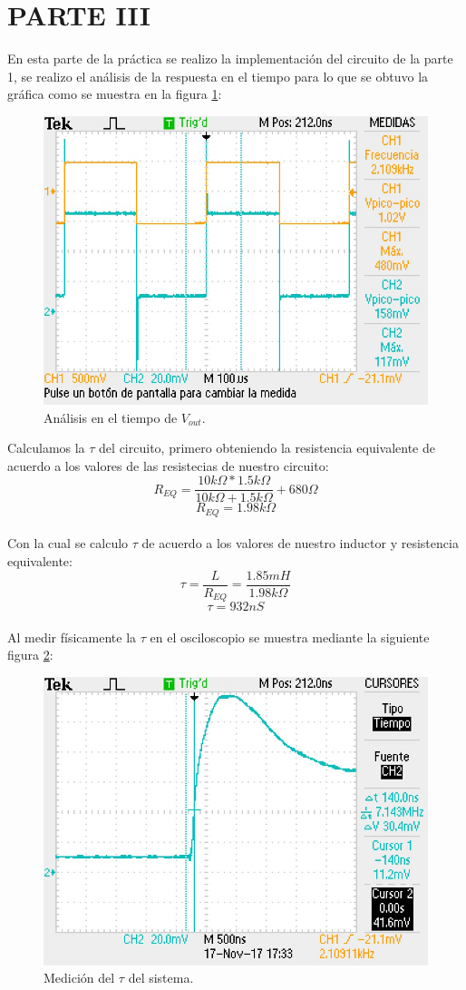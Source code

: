\documentclass[letterpaper,12pt]{article}
\begin{document}
\section*{PARTE III}
En esta parte de la práctica se realizo la implementación del circuito de la parte 1, se realizo el análisis de la respuesta en el tiempo para lo que se obtuvo la gráfica como se muestra en la figura \ref{ATiempo}: 
\begin{figure}[H]
	\centering
	\includegraphics[scale=0.7,angle=90]{TEK0002}
	\caption{Análisis en el tiempo de $V_{out}$.}
	\label{ATiempo}
\end{figure}
\justify
Calculamos la $\tau$ del circuito, primero obteniendo la resistencia equivalente de acuerdo a los valores de las resistecias de nuestro circuito:$$R_{EQ}=\frac{10k\Omega*1.5k\Omega}{10k\Omega+1.5k\Omega}+680\Omega$$ $$R_{EQ}=1.98k\Omega$$
\\
Con la cual se calculo $\tau$ de acuerdo a los valores de nuestro inductor y resistencia equivalente: 
$$\tau=\frac{L}{R_{EQ}}=\frac{1.85mH}{1.98k\Omega}$$ 
$$\tau=932nS$$ 
\\
Al medir físicamente la  $\tau$ en el osciloscopio se muestra mediante la siguiente figura \ref{MTao}:
\begin{figure}[H]
	\centering
	\includegraphics[scale=0.7,angle=90]{TEK0001}
	\caption{Medición del $\tau$ del sistema.}
	\label{MTao}
\end{figure}
\end{document}
